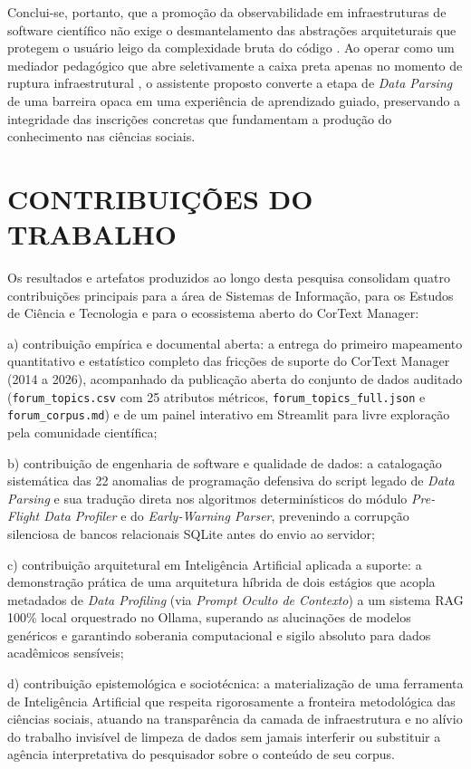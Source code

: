\documentclass[
	oneside,
	a4paper,
	12pt,
	chapter=TITLE,
	section=TITLE,
	english,
	brazilian
]{abntex2}
\begin{document}
Conclui-se, portanto, que a promoção da observabilidade em infraestruturas de software científico não exige o desmantelamento das abstrações arquiteturais que protegem o usuário leigo da complexidade bruta do código \cite{Parnas1972,Norman2013}. Ao operar como um mediador pedagógico que abre seletivamente a caixa preta \cite{Latour1987} apenas no momento de ruptura infraestrutural \cite{Bowker1999}, o assistente proposto converte a etapa de \textit{Data Parsing} de uma barreira opaca em uma experiência de aprendizado guiado, preservando a integridade das inscrições concretas \cite{Abdo2021} que fundamentam a produção do conhecimento nas ciências sociais.

\FloatBarrier
\section{CONTRIBUIÇÕES DO TRABALHO}\label{sec:contribuicoes_do_trabalho}


Os resultados e artefatos produzidos ao longo desta pesquisa consolidam quatro contribuições principais para a área de Sistemas de Informação, para os Estudos de Ciência e Tecnologia e para o ecossistema aberto do CorText Manager:

\par\indent a) contribuição empírica e documental aberta: a entrega do primeiro mapeamento quantitativo e estatístico completo das fricções de suporte do CorText Manager (2014 a 2026), acompanhado da publicação aberta do conjunto de dados auditado (\texttt{forum\_\allowbreak topics.\allowbreak csv} com 25 atributos métricos, \texttt{forum\_\allowbreak topics\_\allowbreak full.\allowbreak json} e \texttt{forum\_\allowbreak corpus.\allowbreak md}) e de um painel interativo em Streamlit para livre exploração pela comunidade científica;
\par\indent b) contribuição de engenharia de software e qualidade de dados: a catalogação sistemática das 22 anomalias de programação defensiva do script legado de \textit{Data Parsing} e sua tradução direta nos algoritmos determinísticos do módulo \textit{Pre-Flight Data Profiler} e do \textit{Early-Warning Parser}, prevenindo a corrupção silenciosa de bancos relacionais SQLite antes do envio ao servidor;
\par\indent c) contribuição arquitetural em Inteligência Artificial aplicada a suporte: a demonstração prática de uma arquitetura híbrida de dois estágios que acopla metadados de \textit{Data Profiling} (via \textit{Prompt Oculto de Contexto}) a um sistema RAG 100\% local orquestrado no Ollama, superando as alucinações de modelos genéricos \cite{Bender2021,Ji2023} e garantindo soberania computacional e sigilo absoluto para dados acadêmicos sensíveis;
\par\indent d) contribuição epistemológica e sociotécnica: a materialização de uma ferramenta de Inteligência Artificial que respeita rigorosamente a fronteira metodológica das ciências sociais, atuando na transparência da camada de infraestrutura e no alívio do trabalho invisível de limpeza de dados \cite{DIgnazio2020,Edwards2010} sem jamais interferir ou substituir a agência interpretativa do pesquisador sobre o conteúdo de seu corpus.
\end{document}

